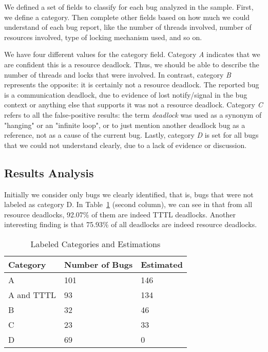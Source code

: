 We defined a set of fields to classify for each bug analyzed in the sample. First, we define a category. Then complete other fields based on how much we could understand of each bug report, like the number of threads involved, number of resources involved, type of locking mechanism used, and so on.

We have four different values for the category field.
Category \emph{A} indicates that  we are confident this is a resource deadlock. Thus, we should be able to describe the number of threads and locks that were involved.
In contrast, category \emph{B} represents the opposite: it is certainly not a resource deadlock. The reported bug is a communication deadlock, due to evidence of lost notify/signal in the bug context or anything else that supports it was not a resource deadlock.
Category \emph{C} refers to all the false-positive results: the term \emph{deadlock} was used as a synonym of "hanging" or an "infinite loop", or to just mention another deadlock bug as a reference, not as a cause of the current bug.
Lastly, category \emph{D} is set for all bugs that we could not understand clearly, due to a lack of evidence or discussion.

\subsection{Results Analysis}

Initially we consider only bugs we clearly identified, that is, bugs that were not labeled as category D.
In Table~\ref{tab:categ} (second column), we can see in that from all resource deadlocks, 92.07\% of them are indeed TTTL deadlocks.
Another interesting finding is that 75.93\% of all deadlocks are indeed resource deadlocks.

\begin{table}
\begin{center}
\caption{Labeled Categories and Estimations}\label{tab:categ}
\begin{tabular}{|l|l|l|}
\hline
Category & Number of Bugs & Estimated \\
\hline
A & 101 & 146 \\
A and TTTL & 93 & 134  \\
B & 32 & 46 \\
C & 23 & 33 \\
D & 69 & 0 \\
\hline
\end{tabular}
\end{center}
\end{table}

